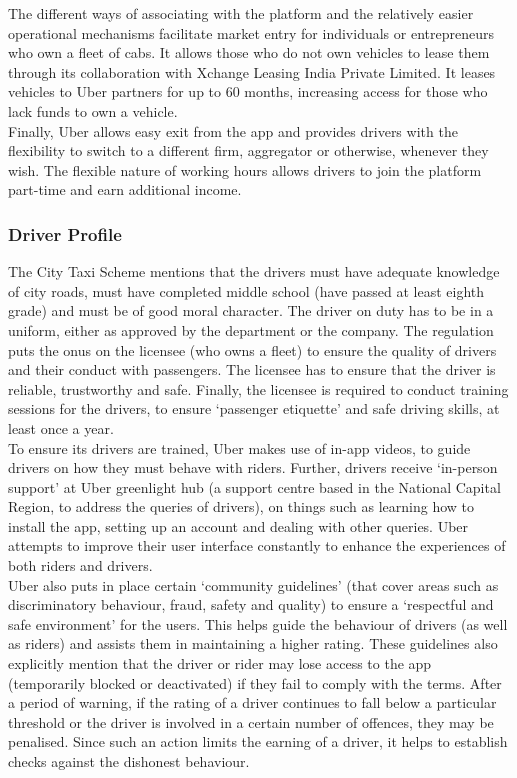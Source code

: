 \documentclass[a4paper, 12pt]{article}
\begin{document}
The different ways of associating with the platform and the relatively easier operational mechanisms facilitate market entry for individuals or entrepreneurs who own a fleet of cabs. It allows those who do not own vehicles to lease them through its collaboration with Xchange Leasing India Private Limited. It leases vehicles to Uber partners for up to 60 months, increasing access for those who lack funds to own a vehicle. \\

Finally, Uber allows easy exit from the app and provides drivers with the flexibility to switch to a different firm, aggregator or otherwise, whenever they wish. The flexible nature of working hours allows drivers to join the platform part-time and earn additional income.\\
\subsubsection{Driver Profile}
The City Taxi Scheme mentions that the drivers must have adequate knowledge of city roads, must have completed middle school (have passed at least eighth grade) and must be of good moral character. The driver on duty has to be in a uniform, either as approved by the department or the company. The regulation puts the onus on the licensee (who owns a fleet) to ensure the quality of drivers and their conduct with passengers. The licensee has to ensure that the driver is reliable, trustworthy and safe. Finally, the licensee is required to conduct training sessions for the drivers, to ensure ‘passenger etiquette’ and safe driving skills, at least once a year. \\

To ensure its drivers are trained, Uber makes use of in-app videos, to guide drivers on how they must behave with riders. Further, drivers receive ‘in-person support’ at Uber greenlight hub (a support centre based in the National Capital Region, to address the queries of drivers), on things such as learning how to install the app, setting up an account and dealing with other queries. Uber attempts to improve their user interface constantly to enhance the experiences of both riders and drivers. \\

Uber also puts in place certain ‘community guidelines’ (that cover areas such as discriminatory behaviour, fraud, safety and quality) to ensure a ‘respectful and safe environment’ for the users. This helps guide the behaviour of drivers (as well as riders) and assists them in maintaining a higher rating. These guidelines also explicitly mention that the driver or rider may lose access to the app (temporarily blocked or deactivated) if they fail to comply with the terms. After a period of warning, if the rating of a driver continues to fall below a particular threshold or the driver is involved in a certain number of offences, they may be penalised. Since such an action limits the earning of a driver, it helps to establish checks against the dishonest behaviour. \\
\end{document}
